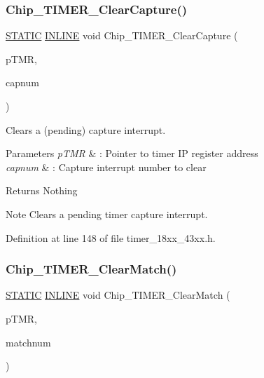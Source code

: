 \subsubsection{\texorpdfstring{Chip\+\_\+\+T\+I\+M\+E\+R\+\_\+\+Clear\+Capture()}{Chip\_TIMER\_ClearCapture()}}
{\footnotesize\ttfamily \hyperlink{group___l_p_c___types___public___macros_ga10b2d890d871e1489bb02b7e70d9bdfb}{S\+T\+A\+T\+IC} \hyperlink{spifi__18xx__43xx_8h_a2eb6f9e0395b47b8d5e3eeae4fe0c116}{I\+N\+L\+I\+NE} void Chip\+\_\+\+T\+I\+M\+E\+R\+\_\+\+Clear\+Capture (\begin{DoxyParamCaption}\item[{\hyperlink{struct_l_p_c___t_i_m_e_r___t}{L\+P\+C\+\_\+\+T\+I\+M\+E\+R\+\_\+T} $\ast$}]{p\+T\+MR,  }\item[{int8\+\_\+t}]{capnum }\end{DoxyParamCaption})}



Clears a (pending) capture interrupt. 


\begin{DoxyParams}{Parameters}
{\em p\+T\+MR} & \+: Pointer to timer IP register address \\
\hline
{\em capnum} & \+: Capture interrupt number to clear \\
\hline
\end{DoxyParams}
\begin{DoxyReturn}{Returns}
Nothing 
\end{DoxyReturn}
\begin{DoxyNote}{Note}
Clears a pending timer capture interrupt. 
\end{DoxyNote}


Definition at line 148 of file timer\+\_\+18xx\+\_\+43xx.\+h.

\mbox{\label{group___t_i_m_e_r__18_x_x__43_x_x_gae9ad45169f0511d27696923acfd6a17e}} 
\subsubsection{\texorpdfstring{Chip\+\_\+\+T\+I\+M\+E\+R\+\_\+\+Clear\+Match()}{Chip\_TIMER\_ClearMatch()}}
{\footnotesize\ttfamily \hyperlink{group___l_p_c___types___public___macros_ga10b2d890d871e1489bb02b7e70d9bdfb}{S\+T\+A\+T\+IC} \hyperlink{spifi__18xx__43xx_8h_a2eb6f9e0395b47b8d5e3eeae4fe0c116}{I\+N\+L\+I\+NE} void Chip\+\_\+\+T\+I\+M\+E\+R\+\_\+\+Clear\+Match (\begin{DoxyParamCaption}\item[{\hyperlink{struct_l_p_c___t_i_m_e_r___t}{L\+P\+C\+\_\+\+T\+I\+M\+E\+R\+\_\+T} $\ast$}]{p\+T\+MR,  }\item[{int8\+\_\+t}]{matchnum }\end{DoxyParamCaption})}



